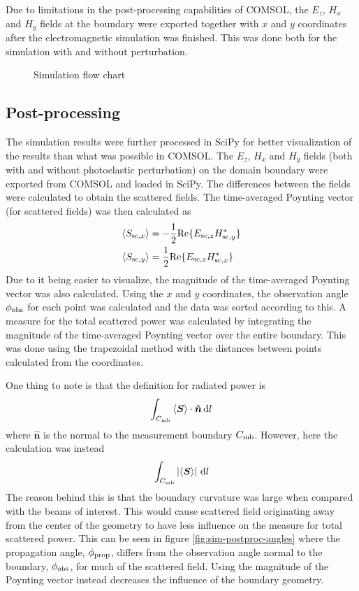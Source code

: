 \documentclass[11pt,twoside]{eitExjobb}
\begin{document}
	Due to limitations in the post-processing capabilities of COMSOL, the $E_z$, $H_x$ and $H_y$ fields at the boundary were exported together with $x$ and $y$ coordinates after the electromagnetic simulation was finished. This was done both for the simulation with and without perturbation.
	
	\begin{figure}[h]
		\centering
		\resizebox{\textwidth}{!}{
			
		}
		\caption{\label{fig:simulationflow} Simulation flow chart}
	\end{figure}
	
	\subsection{Post-processing}
	The simulation results were further processed in SciPy for better visualization of the results than what was possible in COMSOL. The $E_z$, $H_x$ and $H_y$ fields (both with and without photoelastic perturbation) on the domain boundary were exported from COMSOL and loaded in SciPy. The differences between the fields were calculated to obtain the scattered fields. The time-averaged Poynting vector (for scattered fields) was then calculated as
	\begin{align*}
		\left< S_{\mathrm{sc},x} \right> &= -\frac{1}{2} \text{Re} \{ E_{\mathrm{sc},z} H_{\mathrm{sc},y}^* \} \\
		\left< S_{\mathrm{sc},y} \right> &= \frac{1}{2} \text{Re} \{ E_{\mathrm{sc},z} H_{\mathrm{sc},x}^* \}
	\end{align*}
	Due to it being easier to visualize, the magnitude of the time-averaged Poynting vector was also calculated. Using the $x$ and $y$ coordinates, the observation angle $\phi_{\mathrm{obs}}$ for each point was calculated and the data was sorted according to this. A measure for the total scattered power was calculated by integrating the magnitude of the time-averaged Poynting vector over the entire boundary. This was done using the trapezoidal method with the distances between points calculated from the coordinates.
	
	One thing to note is that the definition for radiated power is 
	\begin{equation*}
		\int_{C_{\mathrm{mb}}} \left< \bm{S} \right> \cdot \bm{\hat{n}} \, \mathrm{d}l
	\end{equation*}
	where $\bm{\hat{n}}$ is the normal to the measurement boundary $C_{\mathrm{mb}}$. However, here the calculation was instead
	\begin{equation*}
		\int_{C_{\mathrm{mb}}} \left| \left< \bm{S} \right> \right|  \, \mathrm{d}l
	\end{equation*}
	The reason behind this is that the boundary curvature was large when compared with the beams of interest. This would cause scattered field originating away from the center of the geometry to have less influence on the measure for total scattered power. This can be seen in figure \ref{fig:sim-postproc-angles} where the propagation angle, $\phi_{\mathrm{prop}}$, differs from the observation angle normal to the boundary, $\phi_{\mathrm{obs}}$, for much of the scattered field. Using the magnitude of the Poynting vector instead decreases the influence of the boundary geometry.
	
\end{document}
